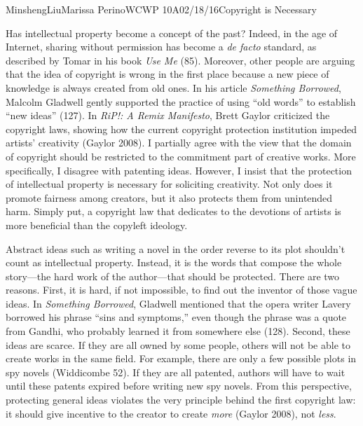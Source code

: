 \documentclass[12pt,letterpaper]{article}
\begin{document}
\begin{mla}{Minsheng}{Liu}{Marissa Perino}{WCWP 10A}{02/18/16}{Copyright is Necessary}

  Has intellectual property become a concept of the past? Indeed, in the
  age of Internet, sharing without permission has become a \emph{de facto}
  standard, as described by Tomar in his book \emph{Use Me} (85).
  Moreover, other people are arguing that the idea of copyright is wrong
  in the first place because a new piece of knowledge is always created
  from old ones. In his article \emph{Something Borrowed}, Malcolm
  Gladwell gently supported the practice of using ``old words'' to
  establish ``new ideas'' (127). In \emph{RiP!: A Remix Manifesto}, Brett
  Gaylor criticized the copyright laws, showing how the current copyright
  protection institution impeded artists' creativity (Gaylor 2008). I
  partially agree with the view that the domain of copyright should be
  restricted to the commitment part of creative works. More specifically,
  I disagree with patenting ideas. However, I insist that the protection
  of intellectual property is necessary for soliciting creativity. Not
  only does it promote fairness among creators, but it also protects them
  from unintended harm. Simply put, a copyright law that dedicates to the
  devotions of artists is more beneficial than the copyleft ideology.

  Abstract ideas such as writing a novel in the order reverse to its plot
  shouldn't count as intellectual property. Instead, it is the words that
  compose the whole story---the hard work of the author---that should be
  protected. There are two reasons. First, it is hard, if not impossible,
  to find out the inventor of those vague ideas. In \emph{Something
  Borrowed}, Gladwell mentioned that the opera writer Lavery borrowed his
  phrase ``sins and symptoms,'' even though the phrase was a quote from
  Gandhi, who probably learned it from somewhere else (128). Second, these
  ideas are scarce. If they are all owned by some people, others will not
  be able to create works in the same field. For example, there are only a
  few possible plots in spy novels (Widdicombe 52). If they are all
  patented, authors will have to wait until these patents expired before
  writing new spy novels. From this perspective, protecting general ideas
  violates the very principle behind the first copyright law: it should
  give incentive to the creator to create \emph{more} (Gaylor 2008), not
  \emph{less}.


\end{mla}
\end{document}
